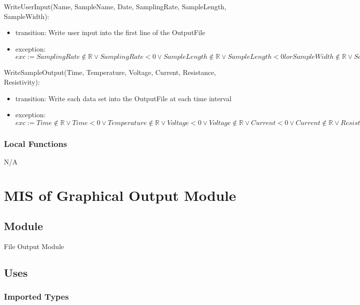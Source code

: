 \documentclass[12pt, titlepage]{article}
\begin{document}
\noindent WriteUserInput(Name, SampleName, Date, SamplingRate, SampleLength, SampleWidth):
\begin{itemize}
\item transition: Write user input into the first line of the OutputFile 
\item exception: $exc:= SamplingRate \notin \mathbb{R} \lor SamplingRate < 0 \lor SampleLength \notin \mathbb{R} \lor SampleLength < 0 lor SampleWidth \notin \mathbb{R} \lor SampleWidth < 0 \Rightarrow INVALID$
\end{itemize}

\noindent WriteSampleOutput(Time, Temperature, Voltage, Current, Resistance, Resistivity):
\begin{itemize}
\item transition: Write each data set into the OutputFile at each time interval
\item exception: $exc:= Time \notin  \mathbb{R} \lor Time < 0 \lor  Temperature \notin  \mathbb{R} \lor Voltage < 0 \lor  Voltage \notin  \mathbb{R} \lor Current < 0 \lor  Current \notin  \mathbb{R} \lor Resistance < 0 \lor  Resistance \notin  \mathbb{R} \lor Resistivity < 0\lor  Resistance \notin  \mathbb{R} \lor Resistivity < 0\Rightarrow INVALID$
\end{itemize}

\subsubsection{Local Functions}

N/A

\newpage

\section{MIS of Graphical Output Module} \label{Module} 

\subsection{Module}

File Output Module

\subsection{Uses}

\subsubsection{Imported Types}
\end{document}
